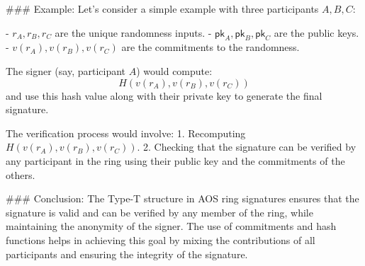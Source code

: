 ### Example:
Let's consider a simple example with three participants \( A, B, C \):

- \( r_A, r_B, r_C \) are the unique randomness inputs.
- \( \mathsf{pk}_A, \mathsf{pk}_B, \mathsf{pk}_C \) are the public keys.
- \( v(r_A), v(r_B), v(r_C) \) are the commitments to the randomness.

The signer (say, participant \( A \)) would compute:
\[ H(v(r_A), v(r_B), v(r_C)) \]
and use this hash value along with their private key to generate the final signature.

The verification process would involve:
1. Recomputing \( H(v(r_A), v(r_B), v(r_C)) \).
2. Checking that the signature can be verified by any participant in the ring using their public key and the commitments of the others.

### Conclusion:
The Type-T structure in AOS ring signatures ensures that the signature is valid and can be verified by any member of the ring, while maintaining the anonymity of the signer. The use of commitments and hash functions helps in achieving this goal by mixing the contributions of all participants and ensuring the integrity of the signature.